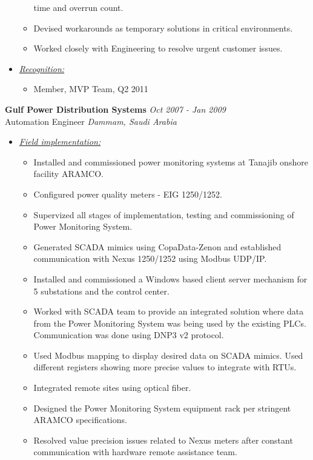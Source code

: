 \documentclass{article}
\begin{document}
\begin{itemize}
\begin{itemize}
                time and overrun count.
          \item Devised workarounds as temporary solutions in critical
                environments.
          \item Worked closely with Engineering to resolve urgent customer
                issues.
          \end{itemize}
    \item \underline{\it Recognition:}
          \begin{itemize}
          \item Member, MVP Team, Q2 2011
          \end{itemize}
    \end{itemize}
    \bigskip

    {\bf Gulf Power Distribution Systems} \hfill {\em Oct 2007 - Jan 2009} \\
    Automation Engineer \hfill {\em Dammam, Saudi Arabia} \\
    \begin{itemize}
    \item \underline{\it Field implementation:}
          \begin{itemize}
          \item Installed and commissioned power monitoring systems at Tanajib
                onshore facility ARAMCO.
          \item Configured power quality meters - EIG 1250/1252.
          \item Supervized all stages of implementation, testing and
                commissioning of Power Monitoring System.
          \item Generated SCADA mimics using CopaData-Zenon and established
                communication with Nexus 1250/1252 using Modbus UDP/IP.
          \item Installed and commissioned a Windows based client server
                mechanism for 5 substations and the control center.
          \item Worked with SCADA team to provide an integrated solution where
                data from the Power Monitoring System was being used by the
                existing PLCs. Communication was done using DNP3 v2 protocol.
          \item Used Modbus mapping to display desired data on SCADA mimics.
                Used different registers showing more precise values to
                integrate with RTUs.
          \item Integrated remote sites using optical fiber.
          \item Designed the Power Monitoring System equipment rack per
                stringent ARAMCO specifications.
          \item Resolved value precision issues related to Nexus meters after
                constant communication with hardware remote assistance team.
          \end{itemize}
    \end{itemize}
    \bigskip
\end{document}
